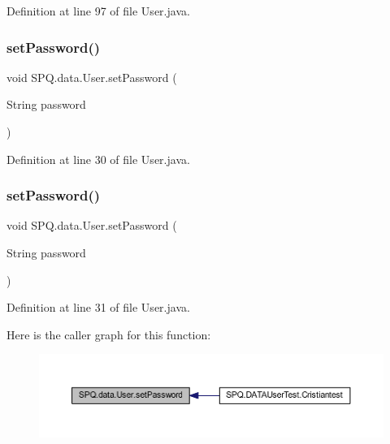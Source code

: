 Definition at line 97 of file User.\+java.

\mbox{\label{class_s_p_q_1_1data_1_1_user_aa5bcf362d3c9c4746f406239bcb041f5}} 
\subsubsection{\texorpdfstring{set\+Password()}{setPassword()}\hspace{0.1cm}{\footnotesize\ttfamily [1/4]}}
{\footnotesize\ttfamily void S\+P\+Q.\+data.\+User.\+set\+Password (\begin{DoxyParamCaption}\item[{String}]{password }\end{DoxyParamCaption})}



Definition at line 30 of file User.\+java.

\mbox{\label{class_s_p_q_1_1data_1_1_user_aa5bcf362d3c9c4746f406239bcb041f5}} 
\subsubsection{\texorpdfstring{set\+Password()}{setPassword()}\hspace{0.1cm}{\footnotesize\ttfamily [2/4]}}
{\footnotesize\ttfamily void S\+P\+Q.\+data.\+User.\+set\+Password (\begin{DoxyParamCaption}\item[{String}]{password }\end{DoxyParamCaption})}



Definition at line 31 of file User.\+java.

Here is the caller graph for this function\+:
\nopagebreak
\begin{figure}[H]
\begin{center}
\leavevmode
\includegraphics[width=350pt]{class_s_p_q_1_1data_1_1_user_aa5bcf362d3c9c4746f406239bcb041f5_icgraph}
\end{center}
\end{figure}
\mbox{\label{class_s_p_q_1_1data_1_1_user_aa5bcf362d3c9c4746f406239bcb041f5}} 
